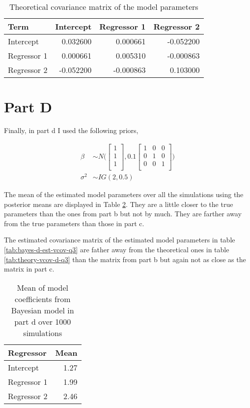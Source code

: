 \documentclass[]{book}
\begin{document}
\begin{table}

\caption{\label{tab:theory-vcov-c-q3}Theoretical covariance matrix of the model parameters}
\centering
\begin{tabular}[t]{lrrr}
\toprule
Term & Intercept & Regressor 1 & Regressor 2\\
\midrule
Intercept & 0.032600 & 0.000661 & -0.052200\\
Regressor 1 & 0.000661 & 0.005310 & -0.000863\\
Regressor 2 & -0.052200 & -0.000863 & 0.103000\\
\bottomrule
\end{tabular}
\end{table}

\hypertarget{part-d-2}{%
\section{Part D}\label{part-d-2}}

Finally, in part d I used the following priors,

\begin{align}
  \beta &\sim N \bigg( 
  \begin{bmatrix}
  1\\
  1\\
  1\\
  \end{bmatrix},
  0.1 \begin{bmatrix}
  1 & 0 & 0\\
  0 & 1 & 0\\
  0 & 0 & 1\\
  \end{bmatrix} \bigg)\\
  \sigma^2 &\sim IG(2, 0.5)
\end{align}

The mean of the estimated model parameters over all the simulations using the posterior means are displayed in Table \ref{tab:bayes-d-mean-coefs-q3}. They are a little closer to the true parameters than the ones from part b but not by much. They are farther away from the true parameters than those in part c.

The estimated covariance matrix of the estimated model parameters in table \ref{tab:bayes-d-est-vcov-q3} are father away from the theoretical ones in table \ref{tab:theory-vcov-d-q3} than the matrix from part b but again not as close as the matrix in part c.

\begin{table}

\caption{\label{tab:bayes-d-mean-coefs-q3}Mean of model coefficients from Bayesian model in part d over 1000 simulations}
\centering
\begin{tabular}[t]{lr}
\toprule
Regressor & Mean\\
\midrule
Intercept & 1.27\\
Regressor 1 & 1.99\\
Regressor 2 & 2.46\\
\bottomrule
\end{tabular}
\end{table}
\end{document}

